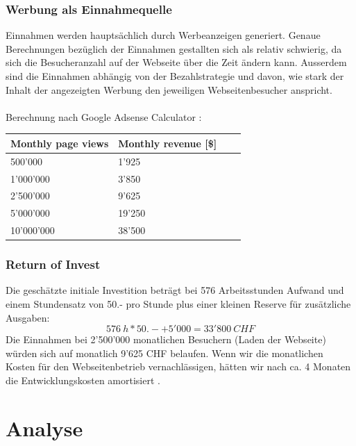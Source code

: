 \documentclass[11pt,ngerman]{article}
\begin{document}
    \subsubsection{Werbung als Einnahmequelle}
    Einnahmen werden hauptsächlich durch Werbeanzeigen generiert. Genaue Berechnungen bezüglich der Einnahmen gestallten sich als relativ schwierig, da sich die Besucheranzahl auf der Webseite über die Zeit ändern kann. Ausserdem sind die Einnahmen abhängig von der Bezahlstrategie und davon, wie stark der Inhalt der angezeigten Werbung den jeweiligen Webseitenbesucher anspricht\cite{CPCVsCPA2019}\cite{daswani2008online}. \\
    \\
    Berechnung nach Google Adsense Calculator \cite{GoogleAdSenseEarn}:
    \begin{center}
        \begin{tabular}{ | l | l | l | p{5cm} |}
            \hline
            Monthly page views & Monthly revenue [\$]  \\ \hline
            500'000 & 1'925 \\ \hline
            1'000'000 & 3'850 \\ \hline
            2'500'000 & 9'625 \\ \hline
            5'000'000 & 19'250 \\ \hline
            10'000'000 & 38'500 \\ \hline
        \end{tabular}
    \end{center}

    \subsubsection{Return of Invest}
    Die geschätzte initiale Investition beträgt bei 576 Arbeitsstunden Aufwand und einem Stundensatz von 50.- pro Stunde plus einer kleinen Reserve für zusätzliche Ausgaben:
    \[576\ h * 50.- + 5'000 = 33'800\ CHF\]
    Die Einnahmen bei 2'500'000 monatlichen Besuchern (Laden der Webseite)  würden sich auf monatlich 9'625 CHF belaufen. Wenn wir die monatlichen Kosten für den Webseitenbetrieb vernachlässigen, hätten wir nach ca. 4 Monaten die Entwicklungskosten amortisiert    .\\

    \newpage

    \section{Analyse}
\end{document}
